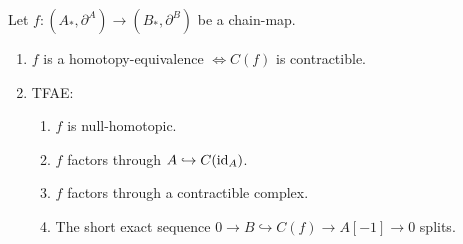 \documentclass[fontsize=11pt,fleqn,a4paper]{scrartcl}
\begin{document}
\begin{lemma}
Let $f:(A_\ast,\partial^A)\to(B_\ast,\partial^B)$ be a chain-map.
\begin{enumerate}
\item $f$ is a homotopy-equivalence $\iff C(f)$ is contractible.
\item TFAE:
\begin{enumerate}
\item $f$ is null-homotopic.
\item $f$ factors through $A\hookrightarrow C(\operatorname{id}_A)$.
\item $f$ factors through a contractible complex.
\item The short exact sequence $0\to B\hookrightarrow C(f)\to A[-1]\to 0$ splits.
\end{enumerate}
\end{enumerate}
\end{lemma}
\end{document}
